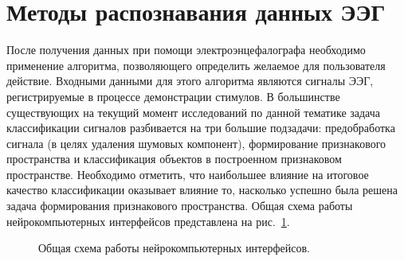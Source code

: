 \documentclass[12pt,fleqn]{article}
\begin{document}

\section{Методы распознавания данных ЭЭГ}
	\par После получения данных при помощи электроэнцефалографа необходимо применение алгоритма, позволяющего определить желаемое для пользователя действие. Входными данными для этого алгоритма являются сигналы ЭЭГ, регистрируемые в процессе демонстрации стимулов. В большинстве существующих на текущий момент исследований по данной тематике задача классификации сигналов разбивается на три большие подзадачи: предобработка сигнала (в целях удаления шумовых компонент), формирование признакового пространства и классификация объектов в построенном признаковом пространстве. Необходимо отметить, что наибольшее влияние на итоговое качество классификации оказывает влияние то, насколько успешно была решена задача формирования признакового пространства. Общая схема работы нейрокомпьютерных интерфейсов представлена на рис.~\ref{bci}.

	\begin{figure}[h!]
	\caption{Общая схема работы нейрокомпьютерных интерфейсов.}
	\label{bci}
	\end{figure}
\end{document}
